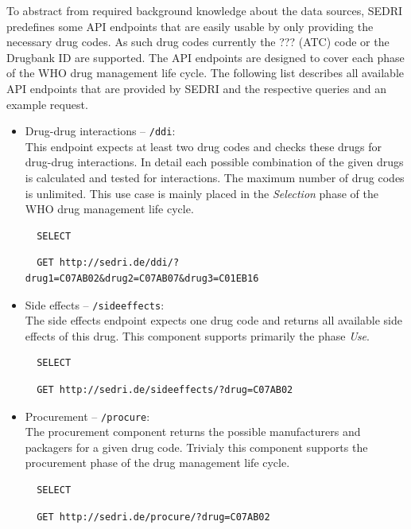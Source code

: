 To abstract from required background knowledge about the data sources, SEDRI predefines some API endpoints that are easily usable by only providing the necessary drug codes.
As such drug codes currently the ??? (ATC) code or the Drugbank ID are supported.
The API endpoints are designed to cover each phase of the WHO drug management life cycle.
The following list describes all available API endpoints that are provided by SEDRI and the respective queries and an example request.

\begin{itemize}
\item Drug-drug interactions -- \texttt{/ddi}:\\
This endpoint expects at least two drug codes and checks these drugs for drug-drug interactions.
In detail each possible combination of the given drugs is calculated and tested for interactions.
The maximum number of drug codes is unlimited.
This use case is mainly placed in the \textit{Selection} phase of the WHO drug management life cycle.
\begin{lstlisting}
  SELECT
\end{lstlisting}
\begin{lstlisting}
  GET http://sedri.de/ddi/?drug1=C07AB02&drug2=C07AB07&drug3=C01EB16
\end{lstlisting}

\item Side effects -- \texttt{/sideeffects}:\\
The side effects endpoint expects one drug code and returns all available side effects of this drug.
This component supports primarily the phase \textit{Use}.
\begin{lstlisting}
  SELECT
\end{lstlisting}
\begin{lstlisting}
  GET http://sedri.de/sideeffects/?drug=C07AB02
\end{lstlisting}

\item Procurement -- \texttt{/procure}:\\
The procurement component returns the possible manufacturers and packagers for a given drug code.
Trivialy this component supports the procurement phase of the drug management life cycle.

\begin{lstlisting}
  SELECT
\end{lstlisting}
\begin{lstlisting}
  GET http://sedri.de/procure/?drug=C07AB02
\end{lstlisting}


\end{itemize}
